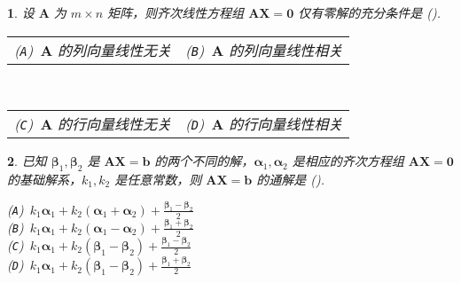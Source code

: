 \documentclass[openany,twocolumn]{ctexbook}
\makeatletter
\numberwithin{figure}{section}
\theoremstyle{change}
\theoremstyle{change}
\newtheorem{titwo}{}
\def\kuo{ \mbox{(\hspace{1pc})}}
\newcommand{\twoch}[4]{\noindent\begin{tabular}{*{2}{@{}p{3.94cm}}}(\texttt{A})~#1 & (\texttt{B})~#2\end{tabular}\\\begin{tabular}{*{2}{@{}p{3.94cm}}}(\texttt{C})~#3 & (\texttt{D})~#4\end{tabular}}  %
\newcommand{\onech}[4]{\noindent(\texttt{A})~#1 \\ (\texttt{B})~#2 \\ (\texttt{C})~#3 \\ (\texttt{D})~#4}  %
\makeatother
\begin{document}
	\begin{titwo}
		设 $\bm A$ 为 $m \times n$ 矩阵，则齐次线性方程组 $\bm A \bm X = \bm 0$ 仅有零解的充分条件是\kuo.

		\twoch{$\bm A$ 的列向量线性无关}{$\bm A$ 的列向量线性相关}{$\bm A$ 的行向量线性无关}{$\bm A$ 的行向量线性相关}
	\end{titwo}

	\begin{titwo}
		已知 $\bm \beta_{1},\bm \beta_{2}$ 是 $\bm A \bm X = \bm b$ 的两个不同的解，$\bm \alpha_{1},\bm \alpha_{2}$ 是相应的齐次方程组 $\bm A \bm X = \bm 0$ 的基础解系，$k_{1},k_{2}$ 是任意常数，则 $\bm A \bm X = \bm b$ 的通解是\kuo.

		\onech%
		{$k_{1} \bm \alpha_{1} + k_{2} ( \bm \alpha_{1} + \bm \alpha_{2} ) + \frac{\bm \beta_{1} - \bm \beta_{2}}{2}$}%
		{$k_{1} \bm \alpha_{1} + k_{2} ( \bm \alpha_{1} - \bm \alpha_{2} ) + \frac{\bm \beta_{1} + \bm \beta_{2}}{2}$}%
		{$k_{1} \bm \alpha_{1} + k_{2} ( \bm \beta_{1} - \bm \beta_{2} ) + \frac{\bm \beta_{1} - \bm \beta_{2}}{2}$}%
		{$k_{1} \bm \alpha_{1} + k_{2} ( \bm \beta_{1} - \bm \beta_{2} ) + \frac{\bm \beta_{1} + \bm \beta_{2}}{2}$}
	\end{titwo}
\end{document}
